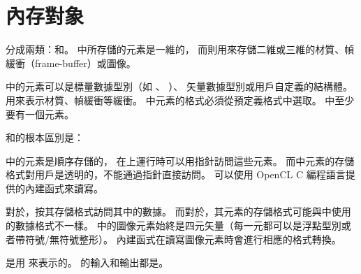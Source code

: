 \section{內存對象}

分成兩類：和。
中所存儲的元素是一維的，
而則用來存儲二維或三維的材質、幀緩衝（frame-buffer）或圖像。

中的元素可以是標量數據型別（如 、 ）、
矢量數據型別或用戶自定義的結構體。
用來表示材質、幀緩衝等緩衝。
中元素的格式必須從預定義格式中選取。
中至少要有一個元素。

和的根本區別是：
\startigBase
\item {}中的元素是順序存儲的，
在上運行時可以用指針訪問這些元素。
而中元素的存儲格式對用戶是透明的，不能通過指針直接訪問。
可以使用 OpenCL C 編程語言提供的內建函式來讀寫。

\item 對於，按其存儲格式訪問其中的數據。
而對於，其元素的存儲格式可能與中使用的數據格式不一樣。
中的圖像元素始終是四元矢量（每一元都可以是浮點型別或者帶符號/無符號整形）。
內建函式在讀寫圖像元素時會進行相應的格式轉換。
\stopigBase

是用  來表示的。
的輸入和輸出都是。

